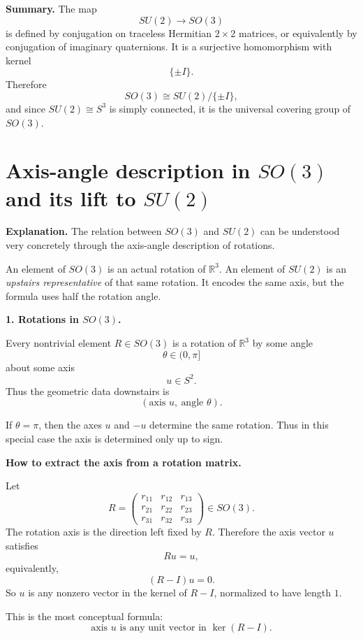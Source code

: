 \documentclass[12pt,a4paper]{article}
\theoremstyle{notespace}
\begin{document}
\medskip

\textbf{Summary.}
The map
\[
SU(2)\to SO(3)
\]
is defined by conjugation on traceless Hermitian \(2\times 2\) matrices, or equivalently by conjugation of imaginary quaternions. It is a surjective homomorphism with kernel
\[
\{\pm I\}.
\]
Therefore
\[
SO(3)\cong SU(2)/\{\pm I\},
\]
and since \(SU(2)\cong S^3\) is simply connected, it is the universal covering group of \(SO(3)\).

\section{Axis-angle description in \(SO(3)\) and its lift to \(SU(2)\)}

\textbf{Explanation.}
The relation between \(SO(3)\) and \(SU(2)\) can be understood very concretely through the axis-angle description of rotations.

An element of \(SO(3)\) is an actual rotation of \(\mathbb R^3\). An element of \(SU(2)\) is an \emph{upstairs representative} of that same rotation. It encodes the same axis, but the formula uses half the rotation angle.

\medskip

\textbf{1. Rotations in \(SO(3)\).}

Every nontrivial element \(R\in SO(3)\) is a rotation of \(\mathbb R^3\) by some angle
\[
\theta\in(0,\pi]
\]
about some axis
\[
u\in S^2.
\]
Thus the geometric data downstairs is
\[
(\text{axis }u,\ \text{angle }\theta).
\]

If \(\theta=\pi\), then the axes \(u\) and \(-u\) determine the same rotation. Thus in this special case the axis is determined only up to sign.

\medskip

\textbf{How to extract the axis from a rotation matrix.}

Let
\[
R=
\begin{pmatrix}
	r_{11}&r_{12}&r_{13}\\
	r_{21}&r_{22}&r_{23}\\
	r_{31}&r_{32}&r_{33}
\end{pmatrix}\in SO(3).
\]
The rotation axis is the direction left fixed by \(R\). Therefore the axis vector \(u\) satisfies
\[
Ru=u,
\]
equivalently,
\[
(R-I)u=0.
\]
So \(u\) is any nonzero vector in the kernel of \(R-I\), normalized to have length \(1\).

This is the most conceptual formula:
\[
\boxed{\text{axis }u\text{ is any unit vector in }\ker(R-I).}
\]
\end{document}
